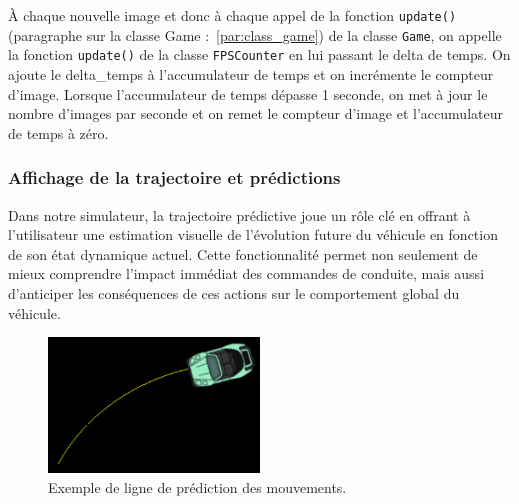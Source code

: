 À chaque nouvelle image et donc à chaque appel de la fonction \texttt{update()} (paragraphe sur la classe Game :~\ref{par:class_game}) de la classe \texttt{Game}, on appelle la fonction \texttt{update()} de la classe \texttt{FPSCounter} en lui passant le delta de temps.
On ajoute le \gls{delta_temps} à l'accumulateur de temps et on incrémente le compteur d'image.
Lorsque l'accumulateur de temps dépasse 1 seconde, on met à jour le nombre d'images par seconde et on remet le compteur d'image et l'accumulateur de temps à zéro.

\subsubsection{Affichage de la trajectoire et prédictions}\label{subsubsec:affichage-de-la-trajectoire-et-predictions}
Dans notre simulateur, la trajectoire prédictive joue un rôle clé en offrant à l'utilisateur une estimation visuelle de l'évolution future du véhicule en fonction de son état dynamique actuel.
Cette fonctionnalité permet non seulement de mieux comprendre l'impact immédiat des commandes de conduite, mais aussi d'anticiper les conséquences de ces actions sur le comportement global du véhicule.

\begin{figure}[H]
    \centering
    \includegraphics[width=0.5\textwidth]{resources/example_prediction_line_1}
    \caption{Exemple de ligne de prédiction des mouvements.}
    \label{fig:prediction_line}
\end{figure}

